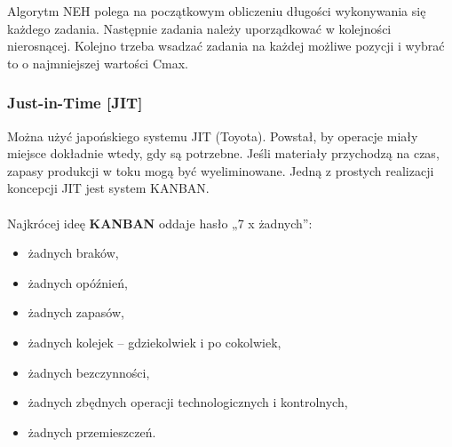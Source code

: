 \documentclass[10pt, a
4paper]{article}
\begin{document}
Algorytm NEH polega na początkowym obliczeniu długości wykonywania się każdego zadania. Następnie zadania należy uporządkować w kolejności nierosnącej. Kolejno trzeba wsadzać zadania na każdej możliwe pozycji i wybrać to o najmniejszej wartości Cmax.
\subsubsection{Just-in-Time [JIT]} 
Można użyć japońskiego systemu JIT (Toyota). Powstał, by operacje miały miejsce dokładnie wtedy, gdy są potrzebne. Jeśli materiały przychodzą na czas, zapasy produkcji w toku mogą być wyeliminowane. Jedną z prostych realizacji koncepcji JIT jest system KANBAN.\\\\
Najkrócej ideę \textbf{KANBAN} oddaje hasło „7 x żadnych”:
\begin{itemize}
\item żadnych braków,
\item żadnych opóźnień,
\item żadnych zapasów,
\item żadnych kolejek – gdziekolwiek i po cokolwiek,
\item żadnych bezczynności,
\item żadnych zbędnych operacji technologicznych i kontrolnych,
\item żadnych przemieszczeń.
\end{itemize}



 


\newpage
\end{document}
